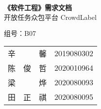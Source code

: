 \vspace*{\fill}
\begin{center}
    \Huge
    \textbf{《软件工程》需求文档}\\
    \vspace{2em}
    开放任务众包平台 CrowdLabel
    \normalsize

    \vspace{2em}
    组号：B07
    \vspace{2em}

    \begin{tabular}{p{0.5em}p{0.5em}p{2em}c}
        辛 &    & 馨 &2019080302 \\
        陈 & 俊 & 哲 & 2020010964 \\
        梁 &    & 烨 &2020080093 \\
        田 & 正 & 祺 & 2020080095\\
    \end{tabular}

\end{center}
\vspace*{\fill}
\newpage

\tableofcontents

\newpage
{}